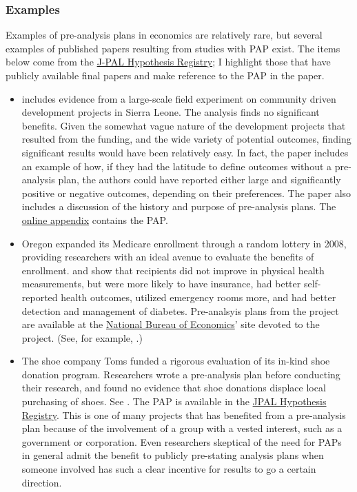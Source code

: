\documentclass[12pt] {article}
\begin{document}
\subsubsection{Examples}\label{examples}
Examples of pre-analysis plans in economics are relatively rare, but several examples of published papers resulting from studies with PAP exist. The items below come from the \href{http://www.povertyactionlab.org/Hypothesis-Registry}{J-PAL Hypothesis Registry}; I highlight those that have publicly available final papers and make reference to the PAP in the paper. 


\begin{itemize}
\item 
 \cite{casey_reshaping_2012} includes evidence from a large-scale field experiment on community driven development projects in Sierra Leone. The analysis finds no significant benefits. Given the somewhat vague nature of the development projects that resulted from the funding, and the wide variety of potential outcomes, finding significant results would have been relatively easy. In fact, the paper includes an example of how, if they had the latitude to define outcomes without a pre-analysis plan, the authors could have reported either large and significantly positive or negative outcomes, depending on their preferences. The paper also includes a discussion of the history and purpose of pre-analysis plans. The \href{http://emiguel.econ.berkeley.edu/assets/miguel_research/8/_Appendix__Reshaping_Institutions_-_Evidence__on__Aid__Impacts__Using__a__Pre___Analysis__Plan.pdf}{online appendix}
contains the PAP.

\item 
Oregon expanded its Medicare enrollment through a random lottery in 2008, providing researchers with an ideal avenue to evaluate the benefits of enrollment. \cite{finkelstein_oregon_2012, doi:10.1056/NEJMsa1212321} and \cite{Taubman17012014} show that recipients did not improve in physical health measurements, but were more likely to have insurance, had better self-reported health outcomes, utilized emergency rooms more, and had better detection and management of diabetes. Pre-analsyis plans from the project are available at the \href{http://www.nber.org/oregon/documents.html}{National Bureau of Economics}' site devoted to the project. (See, for example, \cite{taubman_oregon_2013, baicker_katherine_oregon_2014}.)


\item
The shoe company Toms funded a rigorous evaluation of its in-kind shoe donation program. Researchers wrote a pre-analysis plan before conducting their research, and found no evidence that shoe donations displace local purchasing of shoes. See \cite{wydick_-kind_2014, katz_elizabeth_pre-analysis_2013}. The PAP is available in the \href{http://www.povertyactionlab.org/doc/pre-analysis-planwydick2-12-13pdf}{JPAL Hypothesis Registry}. This is one of many projects that has benefited from a pre-analysis plan because of the involvement of a group with a vested interest, such as a government or corporation. Even researchers skeptical of the need for PAPs in general admit the benefit to publicly pre-stating analysis plans when someone involved has such a clear incentive for results to go a certain direction. 


\end{itemize}
\end{document}
